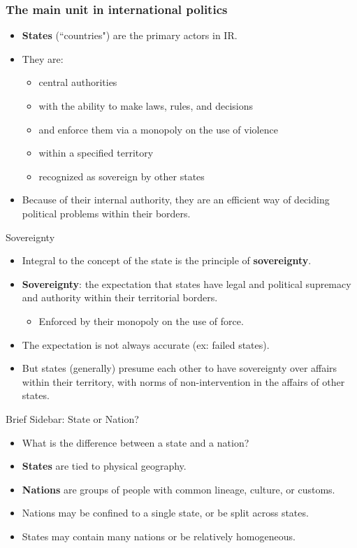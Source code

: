 \documentclass{beamer}
\begin{document}
\begin{frame} 
\frametitle{\LARGE{The main unit in international politics}}
\begin{itemize}
    \item \textbf{States} (``countries") are the primary actors in IR. \pause
    \item They are:
    \begin{itemize}
        \item central authorities \pause 
        \item with the ability to make laws, rules, and decisions \pause
        \item and enforce them via a monopoly on the use of violence \pause
        \item within a specified territory \pause
        \item recognized as sovereign by other states \pause
    \end{itemize}
    \item Because of their internal authority, they are an efficient way of deciding political problems within their borders.
\end{itemize}
\end{frame}

\begin{frame}{\LARGE Sovereignty}
\begin{itemize}
    \item Integral to the concept of the state is the principle of \textbf{sovereignty}. \pause
    \item \textbf{Sovereignty}: the expectation that states have legal and political supremacy and authority within their territorial borders.  \pause
    \begin{itemize}
    	\item Enforced by their monopoly on the use of force. \pause
    \end{itemize}
    \item The expectation is not always accurate (ex: failed states).  \pause
    \item But states (generally) presume each other to have sovereignty over affairs within their territory, with norms of non-intervention in the affairs of other states.
\end{itemize}
\end{frame}


\begin{frame}{\LARGE Brief Sidebar: State or Nation?}
\begin{itemize}
	\item What is the difference between a state and a nation? \pause
    \item \textbf{States} are tied to physical geography. \pause
    \item \textbf{Nations} are groups of people with common lineage, culture, or customs. \pause
    \item Nations may be confined to a single state, or be split across states. \pause
    \item States may contain many nations or be relatively homogeneous.
\end{itemize}
\end{frame}
\end{document}
